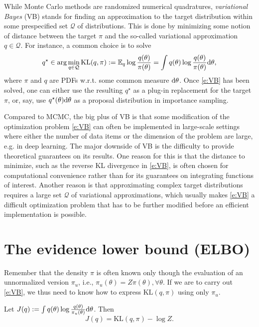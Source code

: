 
While Monte Carlo methods are randomized numerical quadratures, \emph{variational Bayes} (VB) stands for finding an approximation to the target distribution within some prespecified set $\mathcal Q$ of distributions.
This is done by minimizing some notion of distance between the target $\pi$ and the so-called variational approximation $q\in\mathcal Q$.
For instance, a common choice is to solve
\begin{equation}
q^\star \in \arg\min_{q\in\mathcal Q} \text{KL}(q, \pi) := \mathbb E_q \log \frac{q(\theta)}{\pi(\theta)} = \int q(\theta) \log \frac{q(\theta)}{\pi(\theta)} \mathrm{d}\theta,
\label{e:VB}
\end{equation}
where $\pi$ and $q$ are PDFs w.r.t. some common measure $\mathrm{d}\theta$.
Once \eqref{e:VB} has been solved, one can either use the resulting $q^\star$ as a plug-in replacement for the target $\pi$, or, say, use $q^\star(\theta)\mathrm{d}\theta$ as a proposal distribution in importance sampling.

Compared to MCMC, the big plus of VB is that some modification of the optimization problem \eqref{e:VB} can often be implemented in large-scale settings where either the number of data items or the dimension of the problem are large, e.g. in deep learning.
The major downside of VB is the difficulty to provide theoretical guarantees on its results.
One reason for this is that the distance to minimize, such as the reverse KL divergence in \eqref{e:VB}, is often chosen for computational convenience rather than for its guarantees on integrating functions of interest.
Another reason is that approximating complex target distributions requires a large set $\mathcal Q$ of variational approximations, which usually makes \eqref{e:VB} a difficult optimization problem that has to be further modified before an efficient implementation is possible.

\section{The evidence lower bound (ELBO)}
Remember that the density $\pi$ is often known only though the evaluation of an unnormalized version $\pi_u$, i.e., $\pi_u(\theta) = Z\pi(\theta), \forall \theta$.
If we are to carry out \eqref{e:VB}, we thus need to know how to express $\text{KL}(q,\pi)$ using only $\pi_u$.

\begin{lemma}
Let $J(q) := \int q(\theta) \log \frac{q(\theta)}{\pi_u(\theta)}\mathrm{d}\theta$.
Then
\begin{equation}
J(q) = \text{KL}(q, \pi) - \log Z.
\label{e:preELBO}
\end{equation}
\end{lemma}

